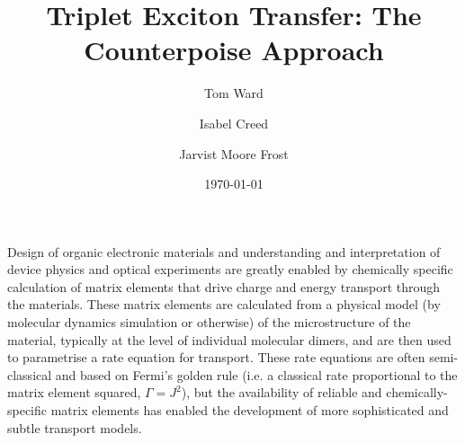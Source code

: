\documentclass[aps,physrev,reprint,superscriptaddress,nofootinbib,amsmath,amssymb,a4paper]{revtex4-2}
\begin{document}
\title{Triplet Exciton Transfer: The Counterpoise Approach}
\date{\today} %

\author{Tom Ward}
\author{Isabel Creed}
\author{Jarvist Moore Frost}

\begin{abstract}
\end{abstract}
\maketitle

Design of organic electronic materials and understanding and interpretation of device physics and optical experiments are greatly enabled by chemically specific calculation of matrix elements that drive charge and energy transport through the materials. 
These matrix elements are calculated from a physical model (by molecular dynamics simulation or otherwise) of the microstructure of the material, typically at the level of individual molecular dimers, and are then used to parametrise a rate equation for transport. 
These rate equations are often semi-classical and based on Fermi's golden rule (i.e. a classical rate proportional to the matrix element squared, $\Gamma = J^2$), but the availability of reliable and chemically-specific matrix elements has enabled the development of more sophisticated and subtle transport models. 
\end{document}
